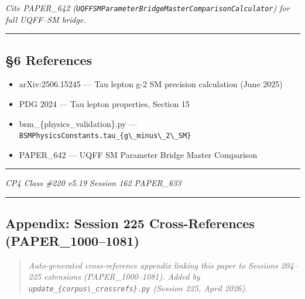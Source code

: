 \emph{Cite PAPER\_642
(\texttt{UQFFSMParameterBridgeMasterComparisonCalculator}) for full
UQFF--SM bridge.}

\begin{center}\rule{0.5\linewidth}{0.5pt}\end{center}

\subsection{§6 References}\label{references}

\begin{itemize}
\tightlist
\item
  arXiv:2506.15245 --- Tau lepton g-2 SM precision calculation (June
  2025)
\item
  PDG 2024 --- Tau lepton properties, Section 15
\item
  bsm\_\{physics\_validation\}.py ---
  \texttt{BSMPhysicsConstants.tau\_\{g\textbackslash{}\_minus\textbackslash{}\_2\textbackslash{}\_SM\}}
\item
  PAPER\_642 --- UQFF SM Parameter Bridge Master Comparison
\end{itemize}

\begin{center}\rule{0.5\linewidth}{0.5pt}\end{center}

\emph{CP4 Class \#220 \textbar{} v5.19 \textbar{} Session 162 \textbar{}
PAPER\_633}

\begin{center}\rule{0.5\linewidth}{0.5pt}\end{center}

\subsection{Appendix: Session 225 Cross-References
(PAPER\_1000--1081)}\label{appendix-session-225-cross-references-paper_10001081}

\begin{quote}
\emph{Auto-generated cross-reference appendix linking this paper to
Sessions 204--225 extensions (PAPER\_1000--1081). Added by
\texttt{update\_\{corpus\textbackslash{}\_crossrefs\}.py} (Session 225,
April 2026).}
\end{quote}

